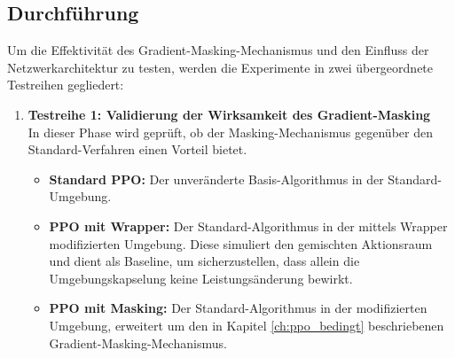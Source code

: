 \subsection{Durchführung}

Um die Effektivität des Gradient\hyp{}Masking-Mechanismus und den Einfluss der Netzwerkarchitektur zu testen, werden die Experimente in zwei übergeordnete Testreihen gegliedert:

\begin{enumerate}
    \item \textbf{Testreihe 1: Validierung der Wirksamkeit des Gradient\hyp{}Masking} \\
    In dieser Phase wird geprüft, ob der Masking-Mechanismus gegenüber den Standard-Verfahren einen Vorteil bietet.
    \begin{itemize}
        \item \textbf{Standard \ac{PPO}:} Der unveränderte Basis\hyp{}Algorithmus in der Standard\hyp{}Umgebung.
        \item \textbf{\ac{PPO} mit Wrapper:} Der Standard\hyp{}Algorithmus in der mittels Wrapper modifizierten Umgebung. Diese simuliert den gemischten Aktionsraum und dient als Baseline, um sicherzustellen, dass allein die Umgebungskapselung keine Leistungsänderung bewirkt.
        \item \textbf{\ac{PPO} mit Masking:} Der Standard\hyp{}Algorithmus in der modifizierten Umgebung, erweitert um den in Kapitel \ref{ch:ppo_bedingt} beschriebenen Gradient\hyp{}Masking-Mechanismus.
    \end{itemize}


\end{enumerate}
